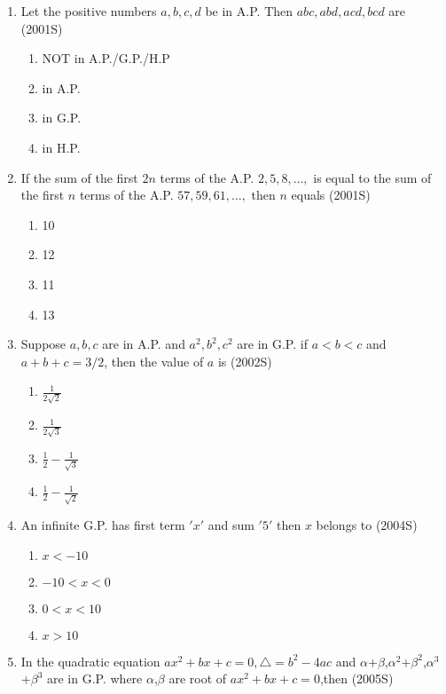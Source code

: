 \documentclass[journal,12pt,twocolumn]{IEEEtran}
\theoremstyle{remark}
\begin{document}
\begin{enumerate}
\begin{enumerate}
    \end{enumerate}
\item Let the positive numbers $a,b,c,d$ be in A.P. Then $abc,abd,acd,bcd$ are \hfill(2001S)
    \begin{enumerate}
        \item NOT in A.P./G.P./H.P
        \item in A.P.
        \item in G.P.
        \item  in H.P.
        \end{enumerate}
\item If the sum of the first $2n$ terms of the A.P. $2,5,8,\dots,$ is equal to the sum of the first $n$ terms of the A.P. $ 57,59,61,\dots,$ then $n$ equals \hfill(2001S)
        \begin{enumerate}
            \item 10
            \item 12
            \item 11
            \item 13
            \end{enumerate}
\item Suppose $a,b,c$ are in A.P. and $a^2,b^2,c^2$ are in G.P. if $a<b<c$ and $a+b+c=3/2$, then the value of $a$ is \hfill(2002S)
            \begin{enumerate}
             \item $\frac{1}{2\sqrt{2}}$
             \item $\frac{1}{2\sqrt{3}}$
             \item $\frac{1}{2}-\frac{1}{\sqrt{3}}$
             \item $\frac{1}{2}-\frac{1}{\sqrt{2}}$
            \end{enumerate}
\item An infinite G.P. has first term $'x'$ and sum $'5'$ then $x$ belongs to \hfill(2004S)
            \begin{enumerate}
                \item $x<-10$
                \item $-10<x<0$
                \item $0<x<10$
                \item $x>10$
                \end{enumerate}
\item In the quadratic equation $ax^2+bx+c=0,\triangle=b^2-4ac$ and $\alpha$+$\beta$,$\alpha^2$+$\beta^2$,$\alpha^3$+$\beta^3$ are in G.P. where $\alpha$,$\beta $ are root of $ax^2+bx+c=0$,then \hfill(2005S)

\end{enumerate}
\end{document}
